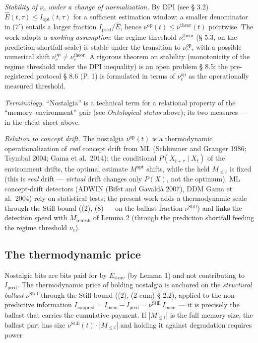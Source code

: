 \documentclass[pdflatex,sn-mathphys-ay]{sn-jnl}
\begin{document}
\emph{Stability of \(\nu_c\) under a change of normalization.} By DPI (see § 3.2) \(\hat E(t,\tau) \le I_{\text{opt}}(t,\tau)\) for a sufficient estimation window; a smaller denominator in (7') entails a larger fraction \(I_{\text{pred}}/\hat E\), hence \(\nu^{\text{op}}(t) \le \nu^{\text{theor}}(t)\) pointwise. The work adopts a \emph{working assumption}: the regime threshold \(\nu_c^{\text{theor}}\) (§ 5.3, on the prediction-shortfall scale) is stable under the transition to \(\nu_c^{\text{op}}\), with a possible numerical shift \(\nu_c^{\text{op}} \ne \nu_c^{\text{theor}}\). A rigorous theorem on stability (monotonicity of the regime threshold under the DPI inequality) is an open problem § 8.5; the pre-registered protocol § 8.6 (P. 1) is formulated in terms of \(\nu_c^{\text{op}}\) as the operationally measured threshold.



\emph{Terminology.} ``Nostalgia'' is a technical term for a relational property of the ``memory--environment'' pair (see \emph{Ontological status} above); its two measures --- in the cheat-sheet above.



\emph{Relation to concept drift.} The nostalgia \(\nu^{\text{op}}(t)\) is a thermodynamic operationalization of \emph{real} concept drift from ML (Schlimmer and Granger 1986; Tsymbal 2004; Gama et al.~2014): the conditional \(P(X_{t+\tau}\mid X_t)\) of the environment drifts, the optimal estimate \(M^{\text{opt}}\) shifts, while the held \(M_{\le t}\) is fixed (this is \emph{real} drift --- \emph{virtual} drift changes only \(P(X)\), not the optimum). ML concept-drift detectors (ADWIN (Bifet and Gavaldà 2007), DDM Gama et al.~2004) rely on statistical tests; the present work adds a thermodynamic scale through the Still bound ((2), (8) --- on the ballast fraction \(\nu^{\text{Still}}\)) and links the detection speed with \(\dot{M}_{\text{refresh}}\) of Lemma 2 (through the prediction shortfall feeding the regime threshold \(\nu_c\)).



\subsection{The thermodynamic price}\label{the-thermodynamic-price}



Nostalgic bits are bits paid for by \(E_{\text{store}}\) (by Lemma 1) and not contributing to \(I_{\text{pred}}\). The thermodynamic price of holding nostalgia is anchored on the \emph{structural ballast} \(\nu^{\text{Still}}\) through the Still bound ((2), (2-cum) § 2.2), applied to the non-predictive information \(I_{\text{nonpred}} = I_{\text{mem}} - I_{\text{pred}} = \nu^{\text{Still}}\, I_{\text{mem}}\) --- it is precisely the ballast that carries the cumulative payment. If \(|M_{\le t}|\) is the full memory size, the ballast part has size \(\nu^{\text{Still}}(t) \cdot |M_{\le t}|\) and holding it against degradation requires power
\end{document}
